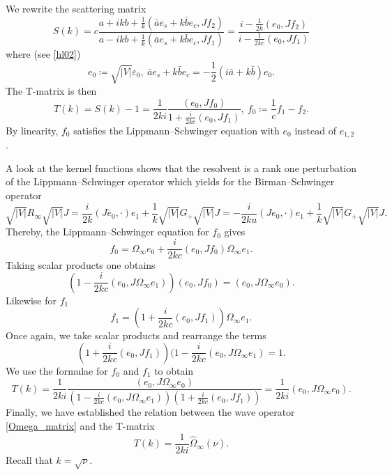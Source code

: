 We rewrite the scattering matrix
\begin{equation*}
  S(k) = c \frac{ a+ikb + \frac{1}{k}(\bar a e_s+k\bar b e_c,Jf_2) }{ a-ikb + \frac{1}{k}(\bar a e_s+k\bar b e_c,Jf_1)}
       = \frac{i-\frac{1}{2k}(e_0,Jf_2)}{i-\frac{1}{2kc}(e_0,Jf_1)}
\end{equation*}
where (see \eqref{hl02})
\begin{equation*}
  e_0\coloneqq \sqrt{|V|}\varepsilon_0,\ \bar a e_s + k\bar b e_c = - \frac{1}{2}(i\bar a+k\bar b)e_0 .
\end{equation*}
The T-matrix is then
\begin{equation*}
  T(k) = S(k) - 1 = \frac{1}{2ki} \frac{(e_0,Jf_0)}{1 + \frac{i}{2kc}(e_0,Jf_1)},\
  f_0 \coloneqq \frac{1}{c}f_1 - f_2 .
\end{equation*}
By linearity, $f_0$ satisfies the Lippmann--Schwinger equation with $e_0$ instead of $e_{1,2}$.

A look at the kernel functions shows that the resolvent is a rank one perturbation of the Lippmann--Schwinger operator
which yields for the Birman--Schwinger operator
\begin{equation*}
  \sqrt{|V|}R_\infty\sqrt{|V|}J 
     = \frac{i}{2k} (J\bar e_0,\cdot) e_1 + \frac{1}{k}\sqrt{|V|}G_+\sqrt{|V|}J
     = - \frac{i}{2ku} (Je_0,\cdot) e_1 + \frac{1}{k}\sqrt{|V|}G_+\sqrt{|V|}J .
\end{equation*}
Thereby, the Lippmann--Schwinger equation for $f_0$ gives
\begin{equation*}
  f_0 = \Omega_\infty e_0 + \frac{i}{2kc} (e_0,Jf_0)\Omega_\infty e_1 .
\end{equation*}
Taking scalar products one obtains
\begin{equation*}
  (1-\frac{i}{2kc}(e_0,J\Omega_\infty e_1))(e_0,Jf_0) = (e_0,J\Omega_\infty e_0) .
\end{equation*}
Likewise for $f_1$
\begin{equation*}
  f_1 = (1 + \frac{i}{2kc}(e_0,Jf_1)) \Omega_\infty e_1 .
\end{equation*}
Once again, we take scalar products and rearrange the terms 
\begin{equation*}
  (1+\frac{i}{2kc}(e_0,Jf_1))(1-\frac{i}{2kc}(e_0,J\Omega_\infty e_1) = 1 .
\end{equation*}
We use the formulae for $f_0$ and $f_1$ to obtain
\begin{equation*}
  T(k) = \frac{1}{2ki} \frac{(e_0,J\Omega_\infty e_0)}{(1-\frac{i}{2kc}(e_0,J\Omega_\infty e_1))(1 + \frac{i}{2kc}(e_0,Jf_1))}
       = \frac{1}{2ki} (e_0,J\Omega_\infty e_0) .
\end{equation*}
Finally, we have established the relation between the wave operator \eqref{Omega_matrix} and the T-matrix
\begin{equation*}
  T(k) = \frac{1}{2ki} \hat\Omega_\infty(\nu) .
\end{equation*}
Recall that $k=\sqrt{\nu}$.
